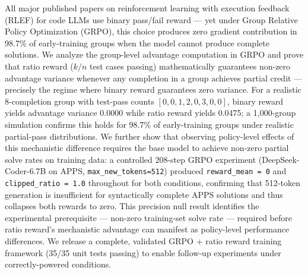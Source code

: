 All major published papers on reinforcement learning with execution feedback (RLEF) for code LLMs use binary pass/fail reward --- yet under Group Relative Policy Optimization (GRPO), this choice produces zero gradient contribution in 98.7\% of early-training groups when the model cannot produce complete solutions. We analyze the group-level advantage computation in GRPO and prove that ratio reward ($k/n$ test cases passing) mathematically guarantees non-zero advantage variance whenever any completion in a group achieves partial credit --- precisely the regime where binary reward guarantees zero variance. For a realistic 8-completion group with test-pass counts $[0, 0, 1, 2, 0, 3, 0, 0]$, binary reward yields advantage variance 0.0000 while ratio reward yields 0.0475; a 1,000-group simulation confirms this holds for 98.7\% of early-training groups under realistic partial-pass distributions. We further show that observing policy-level effects of this mechanistic difference requires the base model to achieve non-zero partial solve rates on training data: a controlled 208-step GRPO experiment (DeepSeek-Coder-6.7B on APPS, \texttt{max\_new\_tokens=512}) produced \texttt{reward\_mean = 0} and \texttt{clipped\_ratio = 1.0} throughout for both conditions, confirming that 512-token generation is insufficient for syntactically complete APPS solutions and thus collapses both rewards to zero. This precision null result identifies the experimental prerequisite --- non-zero training-set solve rate --- required before ratio reward's mechanistic advantage can manifest as policy-level performance differences. We release a complete, validated GRPO + ratio reward training framework (35/35 unit tests passing) to enable follow-up experiments under correctly-powered conditions.
